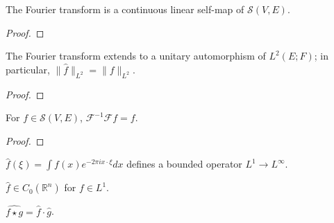 \begin{theorem}
  \label{thm:fourier-schwartz}
  \leanok
  The Fourier transform is a continuous linear self-map of
  $\mathcal{S}(V, E)$.
\end{theorem}
\begin{proof}
  \leanok
\end{proof}

\begin{theorem}
  \label{thm:plancherel}
  \leanok
  The Fourier transform extends to a unitary automorphism of $L^2(E;F)$;
  in particular, $\|\widehat{f}\|_{L^2} = \|f\|_{L^2}$.
\end{theorem}
\begin{proof}
  \leanok
\end{proof}

\begin{theorem}
  \label{thm:fourier-inversion}
  \leanok
  For $f \in \mathcal{S}(V, E)$, $\mathcal{F}^{-1} \mathcal{F} f = f$.
\end{theorem}
\begin{proof}
  \leanok
\end{proof}


\begin{theorem}
  \label{thm:fourierTransform-L1}
  \leanok
  $\widehat{f}(\xi) = \int f(x) e^{-2\pi i x \cdot \xi} dx$ defines a
  bounded operator $L^1 \to L^\infty$.
\end{theorem}

\begin{theorem}
  \label{thm:riemann-lebesgue}
  \leanok
  $\widehat{f} \in C_0(\mathbb R^n)$ for $f \in L^1$.
\end{theorem}

\begin{theorem}
  \label{thm:fourier-convolution}
  \leanok
  $\widehat{f \star g} = \widehat{f} \cdot \widehat{g}$.
\end{theorem}

